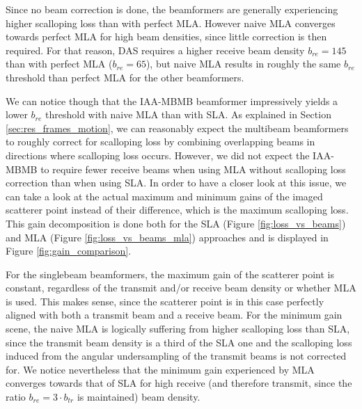 Since no beam correction is done, the beamformers are generally experiencing higher scalloping loss than with perfect MLA. However naive MLA converges towards perfect MLA for high beam densities, since little correction is then required.
For that reason, DAS requires a higher receive beam density $b_{re} = 145$ than with perfect MLA ($b_{re} = 65$), but naive MLA results in roughly the same $b_{re}$ threshold than perfect MLA for the other beamformers.

We can notice though that the IAA-MBMB beamformer impressively yields a lower $b_{re}$ threshold with naive MLA than with SLA.
As explained in Section \ref{sec:res_frames_motion}, we can reasonably expect the multibeam beamformers to roughly correct for scalloping loss by combining overlapping beams in directions where scalloping loss occurs.
However, we did not expect the IAA-MBMB to require fewer receive beams when using MLA without scalloping loss correction than when using SLA.
In order to have a closer look at this issue, we can take a look at the actual maximum and minimum gains of the imaged scatterer point instead of their difference, which is the maximum scalloping loss.
This gain decomposition is done both for the SLA (Figure \ref{fig:loss_vs_beams}) and MLA (Figure \ref{fig:loss_vs_beams_mla}) approaches and is displayed in Figure \ref{fig:gain_comparison}.

For the singlebeam beamformers, the maximum gain of the scatterer point is constant, regardless of the transmit and/or receive beam density or whether MLA is used.
This makes sense, since the scatterer point is in this case perfectly aligned with both a transmit beam and a receive beam.
For the minimum gain scene, the naive MLA is logically suffering from higher scalloping loss than SLA, since the transmit beam density is a third of the SLA one and the scalloping loss induced from the angular undersampling of the transmit beams is not corrected for.
We notice nevertheless that the minimum gain experienced by MLA converges towards that of SLA for high receive (and therefore transmit, since the ratio $b_{re} = 3 \cdot b_{tr}$ is maintained) beam density.

